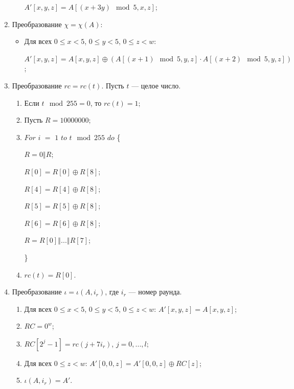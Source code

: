 \documentclass{./civarticle}
\begin{document}
\begin{enumerate}
\begin{itemize}
        $A'[x, y, z] = A[(x + 3y) \mod 5, x, z]$;
        
    \end{itemize}

    \item Преобразование $\chi = \chi(A)$:
    
    \begin{itemize}
        \item Для всех $0 \leq x < 5$, $0 \leq y < 5$, $0 \leq z < w$:

        $A'[x, y, z] = A[x, y, z] \oplus (A[(x+1) \mod 5, y, z] \cdot A[(x+2) \mod 5, y, z])$;
        
    \end{itemize}

    \item Преобразование $rc = rc(t)$. Пусть $t$ --- целое число.

    \begin{enumerate}
        \item Если $t\mod 255 = 0$, то $rc(t) = 1$;
        \item Пусть $R = 10000000$;
        \item $For$ $i$ $=$ $1$ $to$ $t \mod 255$ $do$ \{

        \hspace{0.5cm} $R = 0\mathbin\Vert R$;
        
        \hspace{0.5cm} $R[0] = R[0] \oplus R[8]$;
        
        \hspace{0.5cm} $R[4] = R[4] \oplus R[8]$;
        
        \hspace{0.5cm} $R[5] = R[5] \oplus R[8]$;
        
        \hspace{0.5cm} $R[6] = R[6] \oplus R[8]$;
        
        \hspace{0.5cm} $R = R[0] \mathbin\Vert ... \mathbin\Vert R[7]$;

        \}

        \item $rc(t) = R[0]$.
        
    \end{enumerate}

    \item Преобразование $\iota = \iota(A, i_r)$, где $i_r$ --- номер раунда.

    \begin{enumerate}
        \item Для всех $0 \leq x < 5$, $0 \leq y < 5$, $0 \leq z < w$: $A'[x, y, z] = A[x, y, z]$;
        \item $RC = 0^w$;
        \item $RC[2^j-1] = rc(j + 7i_r)$, $j = 0, ..., l$;
        \item Для всех $0 \leq z < w$: $A'[0, 0, z] = A'[0, 0, z] \oplus RC[z]$;
        \item $\iota(A, i_r) = A'$.
    \end{enumerate}


\end{enumerate}
\end{document}
